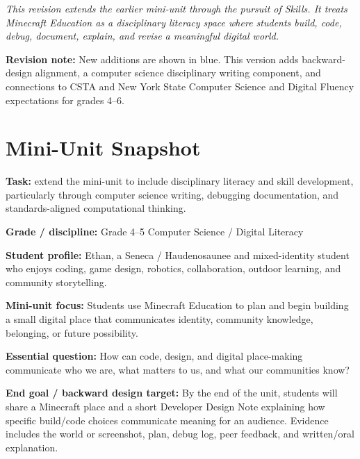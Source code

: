 \begin{titlepage}
\vspace{0.34in}

\begin{center}
\begin{minipage}{0.86\textwidth}
\itshape
This revision extends the earlier mini-unit through the pursuit of Skills. It treats Minecraft Education as a disciplinary literacy space where students build, code, debug, document, explain, and revise a meaningful digital world.

\vspace{0.22in}

\scriptsize\centering\textbf{Revision note:} New additions are shown in \textcolor{LessonTwoAccent}{blue}. This version adds backward-design alignment, a computer science disciplinary writing component, and connections to CSTA and New York State Computer Science and Digital Fluency expectations for grades 4--6.
\end{minipage}
\end{center}

\restoregeometry
\end{titlepage}
\clearpage
\onehalfspacing

\section*{Mini-Unit Snapshot}

\textbf{Task:} extend the mini-unit to include disciplinary literacy and skill development, particularly through computer science writing, debugging documentation, and standards-aligned computational thinking.

\textbf{Grade / discipline:} Grade 4--5 Computer Science / Digital Literacy

\textbf{Student profile:} Ethan, a Seneca / Haudenosaunee and mixed-identity student who enjoys coding, game design, robotics, collaboration, outdoor learning, and community storytelling.

\textbf{Mini-unit focus:} Students use Minecraft Education to plan and begin building a small digital place that communicates identity, community knowledge, belonging, or future possibility.

\textbf{Essential question:} How can code, design, and digital place-making communicate who we are, what matters to us, and what our communities know?

\textbf{End goal / backward design target:} \textcolor{LessonTwoAccent}{By the end of the unit, students will share a Minecraft place and a short Developer Design Note explaining how specific build/code choices communicate meaning for an audience. Evidence includes the world or screenshot, plan, debug log, peer feedback, and written/oral explanation.}

